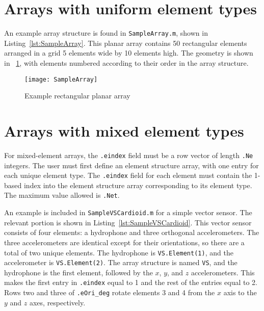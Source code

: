 \section{Arrays with uniform element types}

An example array structure is found in \texttt{SampleArray.m}, shown in Listing~\ref{lst:SampleArray}. This planar array contains 50 rectangular elements arranged in a grid 5 elements wide by 10 elements high. The geometry is shown in \figname~\ref{fig:SampleArray}, with elements numbered according to their order in the array structure.



\begin{figure}[!ht]
\begin{center}
\texttt{[image: SampleArray]}
\caption{\label{fig:SampleArray}Example rectangular planar array}
\end{center}
\end{figure}

\clearpage
\section{Arrays with mixed element types}

For mixed-element arrays, the \texttt{.eindex} field must be a row vector of length \texttt{.Ne} integers. The user must first define an element structure array, with one entry for each unique element type. The \texttt{.eindex} field for each element must contain the 1-based index into the element structure array corresponding to its element type. The maximum value allowed is \texttt{.Net}.

An example is included in \texttt{SampleVSCardioid.m} for a simple vector sensor. The relevant portion is shown in Listing~\ref{lst:SampleVSCardioid}. This vector sensor consists of four elements: a hydrophone and three orthogonal accelerometers. The three accelerometers are identical except for their orientations, so there are a total of two unique elements. The hydrophone is \texttt{VS.Element(1)}, and the accelerometer is \texttt{VS.Element(2)}. The array structure is named \texttt{VS}, and the hydrophone is the first element, followed by the $x$, $y$, and $z$ accelerometers. This makes the first entry in \texttt{.eindex} equal to 1 and the rest of the entries equal to 2. Rows two and three of \texttt{.eOri\_deg} rotate elements 3 and 4 from the $x$ axis to the $y$ and $z$ axes, respectively.



